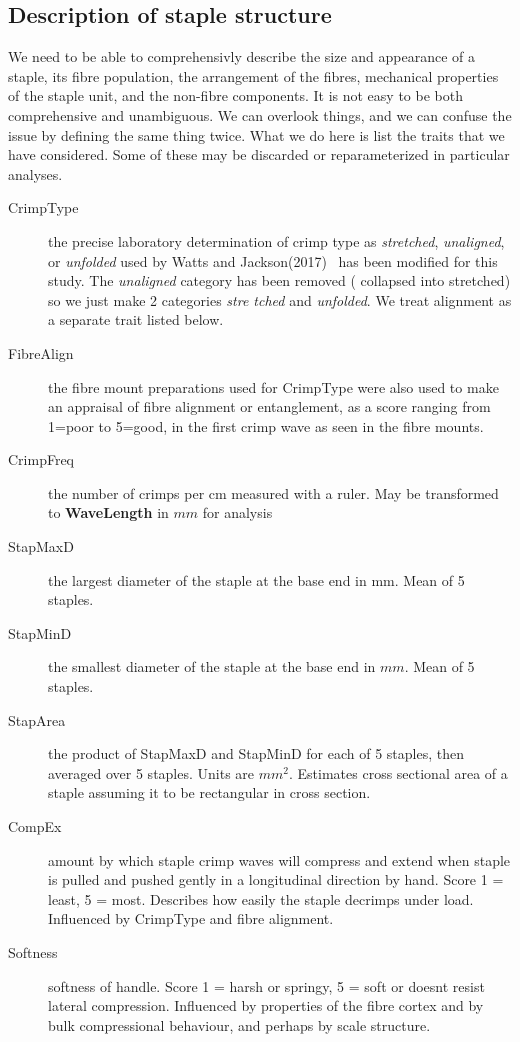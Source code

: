 \documentclass[titlepage]{article}  %
\begin{document}
\subsection{Description of staple structure}
\label{sec:stapstruct}
We need to be able to comprehensivly describe the size and appearance of a staple, its fibre population, the arrangement of the fibres, mechanical properties of the staple unit, and the non-fibre components. It is not easy to be both comprehensive and unambiguous. We can overlook things, and we can confuse the issue by defining the same thing twice.  What we do here is list the traits that we have considered. Some of these may be discarded or reparameterized in particular analyses.
\begin{description}
\item[CrimpType] the precise laboratory determination of crimp type as {\em stretched}, {\em unaligned}, or {\em unfolded} used by Watts and Jackson(2017)~\cite{watt:17} has been modified for this study. The {\em unaligned} category has been removed ( collapsed into stretched) so we just make 2 categories {\em stre
tched} and {\em unfolded}. We treat alignment as a separate trait listed below.
\item[FibreAlign] the fibre mount preparations used for CrimpType were also used to make an appraisal of fibre alignment or entanglement, as a score ranging from 1=poor to 5=good, in the first crimp wave as seen in the fibre mounts. 
\item[CrimpFreq] the number of crimps per cm measured with a ruler. May be transformed to {\bf WaveLength} in $mm$ for analysis
\item[StapMaxD] the largest diameter of the staple at the base end in mm.  Mean of 5 staples.
\item[StapMinD] the smallest diameter of the staple at the base end in $mm$.  Mean of 5 staples.
\item[StapArea] the product of StapMaxD and StapMinD for each of 5 staples, then averaged over 5 staples. Units are $mm^{2}$. Estimates cross sectional area of a staple assuming it to be rectangular in cross section.
\item[CompEx] amount by which staple crimp waves will compress and extend when staple is pulled  and pushed gently in a longitudinal direction by hand. Score 1 = least, 5 = most. Describes how easily the staple decrimps under load. Influenced by CrimpType and fibre alignment.
\item[Softness] softness of handle. Score 1 = harsh or springy, 5 = soft or doesnt resist lateral compression. Influenced by properties of the fibre cortex and by bulk compressional behaviour, and perhaps by scale structure.

\end{description}
\end{document}
